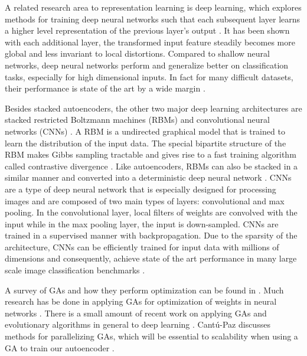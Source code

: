 A related research area to representation learning is deep learning, which explores methods for training deep neural networks such that each subsequent layer learns a higher level representation of the previous layer's output \cite{bengio2009learning}. It has been shown with each additional layer, the transformed input feature steadily becomes more global and less invariant to local distortions. Compared to shallow neural networks, deep neural networks perform and generalize better on classification tasks, especially for high dimensional inputs. In fact for many difficult datasets, their performance is state of the art by a wide margin \cite{schmidhuber2014deep}. 

Besides stacked autoencoders, the other two major deep learning architectures are stacked restricted Boltzmann machines (RBMs) \cite{hinton2006fast} and convolutional neural networks (CNNs) \cite{lecun1995convolutional}. A RBM is a undirected graphical model that is trained to learn the distribution of the input data. The special bipartite structure of the RBM makes Gibbs sampling tractable and gives rise to a fast training algorithm called contrastive divergence \cite{hinton2006fast,hinton2006learning}. Like autoencoders, RBMs can also be stacked in a similar manner and converted into a deterministic deep neural network \cite{hinton2006reducing}. CNNs are a type of deep neural network that is especially designed for processing images and are composed of two main types of layers: convolutional and max pooling. In the convolutional layer, local filters of weights are convolved with the input while in the max pooling layer, the input is down-sampled. CNNs are trained in a supervised manner with backpropagation. Due to the sparsity of the architecture, CNNs can be efficiently trained for input data with millions of dimensions and consequently, achieve state of the art performance in many large scale image classification benchmarks \cite{ciresan2011committee,krizhevsky2012imagenet,goodfellow2013multi}.

A survey of GAs and how they perform optimization can be found in \cite{srinivas1994genetic}. Much research has be done in applying GAs for optimization of weights in neural networks \cite{gomez2006efficient,floreano2008neuroevolution}. There is a small amount of recent work on applying GAs and evolutionary algorithms in general to deep learning \cite{koutnik2014evolving,david2014genetic}. Cant{\'u}-Paz discusses methods for parallelizing GAs, which will be essential to scalability when using a GA to train our autoencoder \cite{cantu1998survey}.

